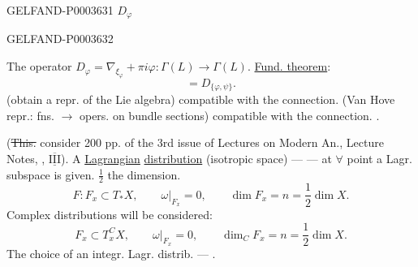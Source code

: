 \begin{GelfandAdjacentEvidence}{GELFAND-P000363}{1}
\sout{$D_\varphi$}
\end{GelfandAdjacentEvidence}
\begin{GelfandAdjacentEvidence}{GELFAND-P000363}{2}

The operator $D_\varphi=\nabla_{\xi_\varphi}+\pi i\varphi:\Gamma (L)\to\Gamma (L)$.
\uline{Fund. theorem}:
\begin{equation*}[D_\varphi, D_\psi]=D_{\{\varphi,\psi\}}.\end{equation*}
(obtain a repr. of the Lie algebra) compatible with the connection.
(Van Hove repr.: fns. $\to$ opers. on bundle sections) compatible with the connection.
.



\end{GelfandAdjacentEvidence}

(\sout{This.} consider 200 pp. of the 3rd issue of Lectures on Modern An., Lecture Notes,
, $\overline{\underline{\mathrm{III}}}$).
A \uline{Lagrangian} \uline{distribution} (isotropic space) ---
--- at $\forall$ point a Lagr. subspace is given. $\frac12$ the dimension.
\begin{equation*}F: F_x\subset T_*X,\qquad\omega|_{F_x}=0,\qquad\dim F_x=n=\frac12\dim X.\end{equation*}
Complex distributions will be considered:
\begin{equation*}F_x\subset T_x^CX,\qquad\omega|_{F_x}=0,\qquad\dim_C F_x=n=\frac12\dim X.\end{equation*}
The choice of an integr. Lagr. distrib. --- .



